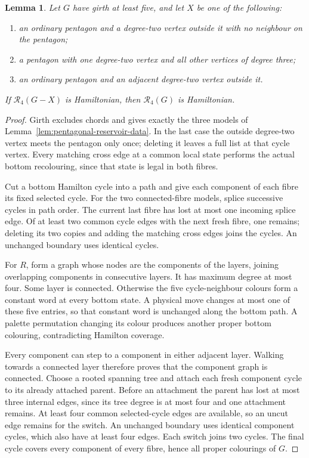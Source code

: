 \documentclass[11pt]{article}
\newtheorem{lemma}[theorem]{Lemma}
\theoremstyle{remark}
\newcommand{\R}{\mathcal R}
\numberwithin{equation}{section}
\numberwithin{table}{section}
\begin{document}
\begin{lemma}\label{lem:pentagonal-reservoirs}
Let $G$ have girth at least five, and let $X$ be one of the following:
\begin{enumerate}
\item an ordinary pentagon and a degree-two vertex outside it with no
neighbour on the pentagon;
\item a pentagon with one degree-two vertex and all other vertices of
degree three;
\item an ordinary pentagon and an adjacent degree-two vertex outside it.
\end{enumerate}
If $\R_4(G-X)$ is Hamiltonian, then $\R_4(G)$ is Hamiltonian.
\end{lemma}
\begin{proof}
Girth excludes chords and gives exactly the three models of
Lemma~\ref{lem:pentagonal-reservoir-data}. In the last case the outside
degree-two vertex meets the pentagon only once; deleting it leaves a full
list at that cycle vertex. Every matching cross edge at a common local
state performs the actual bottom recolouring, since that state is legal
in both fibres.

Cut a bottom Hamilton cycle into a path and give each component of each
fibre its fixed selected cycle. For the two connected-fibre models, splice
successive cycles in path order. The current last fibre has lost at most
one incoming splice edge. Of at least two common cycle edges with the next
fresh fibre, one remains; deleting its two copies and adding the matching
cross edges joins the cycles. An unchanged boundary uses identical cycles.

For $R$, form a graph whose nodes are the components of the layers, joining
overlapping components in consecutive layers. It has maximum degree at
most four. Some layer is connected. Otherwise the five cycle-neighbour
colours form a constant word at every bottom state. A physical move changes
at most one of these five entries, so that constant word is unchanged along
the bottom path. A palette permutation changing its colour produces another
proper bottom colouring, contradicting Hamilton coverage.

Every component can step to a component in either adjacent layer. Walking
towards a connected layer therefore proves that the component graph is
connected. Choose a rooted spanning tree and attach each fresh component
cycle to its already attached parent. Before an attachment the parent has
lost at most three internal edges, since its tree degree is at most four
and one attachment remains. At least four common selected-cycle edges are
available, so an uncut edge remains for the switch. An unchanged boundary
uses identical component cycles, which also have at least four edges.
Each switch joins two cycles. The final cycle covers every component of
every fibre, hence all proper colourings of $G$.
\end{proof}
\end{document}
